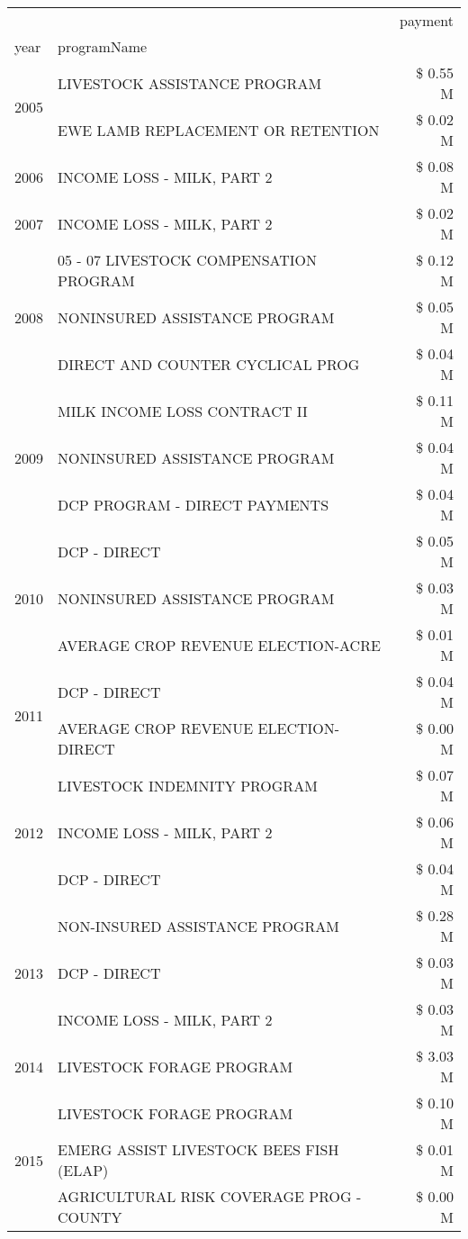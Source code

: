 \begin{tabular}{llr}
\toprule
 &  & payment \\
year & programName &  \\
\midrule
\multirow[t]{2}{*}{2005} & LIVESTOCK ASSISTANCE PROGRAM & \$ 0.55 M \\
 & EWE LAMB REPLACEMENT OR RETENTION & \$ 0.02 M \\
\cline{1-3}
2006 & INCOME LOSS - MILK, PART 2 & \$ 0.08 M \\
\cline{1-3}
2007 & INCOME LOSS - MILK, PART 2 & \$ 0.02 M \\
\cline{1-3}
\multirow[t]{3}{*}{2008} & 05 - 07 LIVESTOCK COMPENSATION PROGRAM & \$ 0.12 M \\
 & NONINSURED ASSISTANCE PROGRAM & \$ 0.05 M \\
 & DIRECT AND COUNTER CYCLICAL PROG & \$ 0.04 M \\
\cline{1-3}
\multirow[t]{3}{*}{2009} & MILK INCOME LOSS CONTRACT II & \$ 0.11 M \\
 & NONINSURED ASSISTANCE PROGRAM & \$ 0.04 M \\
 & DCP PROGRAM - DIRECT PAYMENTS & \$ 0.04 M \\
\cline{1-3}
\multirow[t]{3}{*}{2010} & DCP - DIRECT & \$ 0.05 M \\
 & NONINSURED ASSISTANCE PROGRAM & \$ 0.03 M \\
 & AVERAGE CROP REVENUE ELECTION-ACRE & \$ 0.01 M \\
\cline{1-3}
\multirow[t]{2}{*}{2011} & DCP - DIRECT & \$ 0.04 M \\
 & AVERAGE CROP REVENUE ELECTION-DIRECT & \$ 0.00 M \\
\cline{1-3}
\multirow[t]{3}{*}{2012} & LIVESTOCK INDEMNITY PROGRAM & \$ 0.07 M \\
 & INCOME LOSS - MILK, PART 2 & \$ 0.06 M \\
 & DCP - DIRECT & \$ 0.04 M \\
\cline{1-3}
\multirow[t]{3}{*}{2013} & NON-INSURED ASSISTANCE PROGRAM & \$ 0.28 M \\
 & DCP - DIRECT & \$ 0.03 M \\
 & INCOME LOSS - MILK, PART 2 & \$ 0.03 M \\
\cline{1-3}
2014 & LIVESTOCK FORAGE PROGRAM & \$ 3.03 M \\
\cline{1-3}
\multirow[t]{3}{*}{2015} & LIVESTOCK FORAGE PROGRAM & \$ 0.10 M \\
 & EMERG ASSIST LIVESTOCK BEES FISH (ELAP) & \$ 0.01 M \\
 & AGRICULTURAL RISK COVERAGE PROG - COUNTY & \$ 0.00 M \\

\end{tabular}
